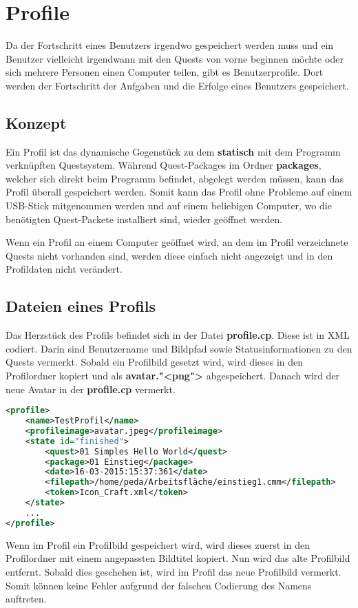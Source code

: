 \section{Profile}
Da der Fortschritt eines Benutzers irgendwo gespeichert werden muss und ein Benutzer vielleicht irgendwann mit den Quests von vorne beginnen möchte oder sich mehrere Personen einen Computer teilen, gibt es Benutzerprofile. Dort werden der Fortschritt der Aufgaben und die Erfolge eines Benutzers gespeichert.

\subsection{Konzept}
Ein Profil ist das dynamische Gegenstück zu dem \textbf{statisch} mit dem Programm verknüpften Questsystem. Während Quest-Packages im Ordner \textbf{packages}, welcher sich direkt beim Programm befindet, abgelegt werden müssen, kann das Profil überall gespeichert werden. Somit kann das Profil ohne Probleme auf einem USB-Stick mitgenommen werden und auf einem beliebigen Computer, wo die benötigten Quest-Packete installiert sind, wieder geöffnet werden.

Wenn ein Profil an einem Computer geöffnet wird, an dem im Profil verzeichnete Quests nicht vorhanden sind, werden diese einfach nicht angezeigt und in den Profildaten nicht verändert.

\subsection{Dateien eines Profils}
Das Herzstück des Profils befindet sich in der Datei \textbf{profile.cp}. Diese ist in XML codiert. Darin sind Benutzername und Bildpfad sowie Statusinformationen zu den Quests vermerkt. Sobald ein Profilbild gesetzt wird, wird dieses in den Profilordner kopiert und als \textbf{avatar."<png">} abgespeichert. Danach wird der neue Avatar in der \textbf{profile.cp} vermerkt.

\begin{lstlisting}[language=XML]
<profile>
	<name>TestProfil</name>
	<profileimage>avatar.jpeg</profileimage>
	<state id="finished">
		<quest>01 Simples Hello World</quest>
		<package>01 Einstieg</package>
		<date>16-03-2015:15:37:361</date>
		<filepath>/home/peda/Arbeitsfläche/einstieg1.cmm</filepath>
		<token>Icon_Craft.xml</token>
	</state>
	...
</profile>
\end{lstlisting}
Wenn im Profil ein Profilbild gespeichert wird, wird dieses zuerst in den Profilordner mit einem angepassten Bildtitel kopiert. Nun wird das alte Profilbild entfernt. Sobald dies geschehen ist, wird im Profil das neue Profilbild vermerkt. Somit können keine Fehler aufgrund der falschen Codierung des Namens auftreten.

